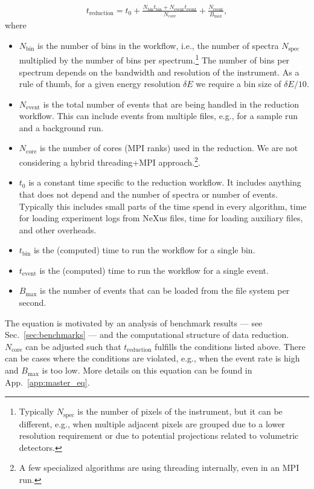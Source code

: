 \documentclass[a4paper,english,numbers=noenddot,bibliography=totoc,chapterprefix=on,DIV=12]{scrartcl}
\newcommand{\Treduction}{t_{\text{reduction}}}
\newcommand{\Tbin}{t_{\text{bin}}}
\newcommand{\Tevent}{t_{\text{event}}}
\newcommand{\Nbin}{N_{\text{bin}}}
\newcommand{\Ncore}{N_{\text{core}}}
\newcommand{\Nevent}{N_{\text{event}}}
\newcommand{\Nspec}{N_{\text{spec}}}
\newcommand{\Bmax}{B_{\text{max}}}
\begin{document}
\begin{align}
  \Treduction = t_0 + \frac{\Nbin\Tbin + \Nevent\Tevent}{\Ncore} + \frac{\Nevent}{\Bmax},
  \label{eq:master}
\end{align}
where
\begin{itemize}
  \item $\Nbin$ is the number of bins in the workflow, i.e., the number of spectra $\Nspec$ multiplied by the number of bins per spectrum.\footnote{Typically $\Nspec$ is the number of pixels of the instrument, but it can be different, e.g., when multiple adjacent pixels are grouped due to a lower resolution requirement or due to potential projections related to volumetric detectors.}
    The number of bins per spectrum depends on the bandwidth and resolution of the instrument.
    As a rule of thumb, for a given energy resolution $\delta E$ we require a bin size of $\delta E/10$.
  \item $\Nevent$ is the total number of events that are being handled in the reduction workflow.
    This can include events from multiple files, e.g., for a sample run and a background run.
  \item $\Ncore$ is the number of cores (MPI ranks) used in the reduction.
    We are not considering a hybrid threading+MPI approach.\footnote{A few specialized algorithms are using threading internally, even in an MPI run.}.
  \item $t_0$ is a constant time specific to the reduction workflow.
    It includes anything that does not depend and the number of spectra or number of events.
    Typically this includes small parts of the time spend in every algorithm, time for loading experiment logs from NeXus files, time for loading auxiliary files, and other overheads.
  \item $\Tbin$ is the (computed) time to run the workflow for a single bin.
  \item $\Tevent$ is the (computed) time to run the workflow for a single event.
  \item $\Bmax$ is the number of events that can be loaded from the file system per second.
\end{itemize}
The equation is motivated by an analysis of benchmark results --- see Sec.~\ref{sec:benchmarks} --- and the computational structure of data reduction.
$\Ncore$ can be adjusted such that $\Treduction$ fulfills the conditions listed above.
There can be cases where the conditions are violated, e.g., when the event rate is high and $\Bmax$ is too low.
More details on this equation can be found in App.~\ref{app:master_eq}.
\end{document}
